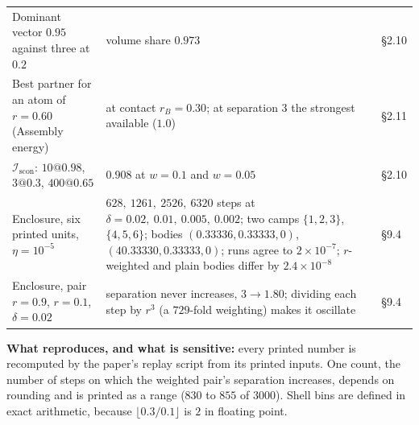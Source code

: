 \documentclass[10.5pt]{article}
\begin{document}
{\begin{longtable}{L{5.2cm}L{9.5cm}L{1.6cm}}
Dominant vector $0.95$ against three at $0.2$ & volume share $0.973$ & §2.10 \\
Best partner for an atom of $r=0.60$ (Assembly energy) & at contact $r_B=0.30$; at separation $3$ the strongest available ($1.0$) & §2.11 \\
$\mathcal{I}_{\mathrm{scon}}$: $10@0.98$, $3@0.3$, $400@0.65$ & $0.908$ at $w=0.1$ and $w=0.05$ & §2.10 \\
Enclosure, six printed units, $\eta=10^{-5}$ & $628,\ 1261,\ 2526,\ 6320$ steps at $\delta=0.02,\ 0.01,\ 0.005,\ 0.002$; two camps $\{1,2,3\}$, $\{4,5,6\}$; bodies $(0.33336,0.33333,0)$, $(40.33330,0.33333,0)$; runs agree to $2\times10^{-7}$; $r$-weighted and plain bodies differ by $2.4\times10^{-8}$ & §9.4 \\
Enclosure, pair $r=0.9$, $r=0.1$, $\delta=0.02$ & separation never increases, $3\to1.80$; dividing each step by $r^3$ (a $729$-fold weighting) makes it oscillate & §9.4 \\
\bottomrule
\end{longtable}}
\textbf{What reproduces, and what is sensitive:} every printed number is recomputed by the paper's replay script from its printed inputs. One count, the number of steps on which the weighted pair's separation increases, depends on rounding and is printed as a range ($830$ to $855$ of $3000$). Shell bins are defined in exact arithmetic, because $\lfloor0.3/0.1\rfloor$ is $2$ in floating point.
\end{document}

